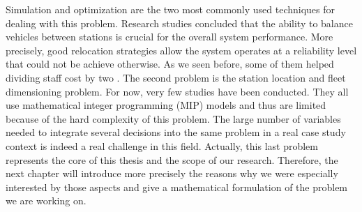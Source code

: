 \begin{bibunit}[ieeetr]
\medskip
Simulation and optimization are the two most commonly used techniques for dealing with this problem.
Research studies concluded that the ability to balance vehicles between stations is crucial for the overall system performance.
More precisely, good relocation strategies allow the system operates at a reliability level that could not be achieve otherwise.
As we seen before, some of them helped dividing staff cost by two \cite{kek_decision_2009}.
The second problem is the station location and  fleet dimensioning problem.
For now, very few studies have been conducted.
They all use mathematical integer programming (MIP) models and thus are limited because of the hard complexity of this problem.
The large number of variables needed to integrate several decisions into the same problem in a real case study context is indeed a real challenge in this field.
Actually, this last problem represents the core of this thesis and the scope of our research.
Therefore, the next chapter will introduce more precisely the reasons why we were especially interested by those aspects and give a mathematical formulation of the problem we are working on.


\newpage
{}
\renewcommand{\bibname}{Bibliography of chapter \thechapter}
\end{bibunit}
